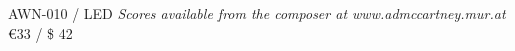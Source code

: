 \documentclass{article}
\begin{document}
\null \vfill

AWN-010 / LED \hfill
\textit{Scores available from the composer at www.admccartney.mur.at}
\hfill \euro 33 / \$ 42
\end{document}
